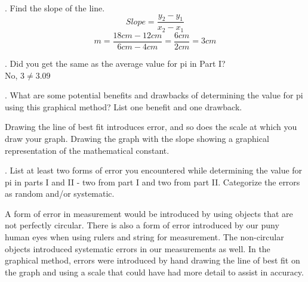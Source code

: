 \documentclass[12pt]{article}
\begin{document}
. Find the slope of the line. \\
$$Slope = \frac{y_2-y_1}{x_2-x_1}$$
$$m = \frac{18cm-12cm}{6cm-4cm} = \frac{6cm}{2cm} = 3cm$$ 

. Did you get the same as the average value for pi in Part I? \\
\indent No, $3 \not= 3.09$ 

. What are some potential benefits and drawbacks of determining the value for pi using this graphical method? List one benefit and one drawback.

Drawing the line of best fit introduces error, and so does the scale at which you draw your graph. Drawing the graph with the slope showing a graphical representation of the mathematical constant. 

. List at least two forms of error you encountered while determining the value for pi in parts I and II - two from part I and two from part II. Categorize the errors as random and/or systematic.

A form of error in measurement would be introduced by using objects that are not perfectly circular. There is also a form of error introduced by our puny human eyes when using rulers and string for measurement. The non-circular objects introduced systematic errors in our measurements as well. In the graphical method, errors were introduced by hand drawing the line of best fit on the graph and using a scale that could have had more detail to assist in accuracy. \\
\pagebreak
\end{document}
